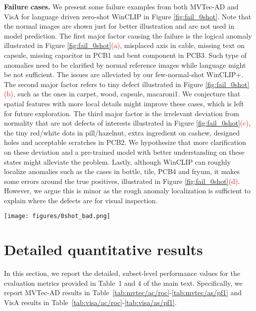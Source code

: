 \clearpage
\noindent\textbf{Failure cases. } 
We present some failure examples from both MVTec-AD and VisA for language driven zero-shot WinCLIP in Figure \ref{fig:fail_0shot}. Note that the normal images are shown just for better illustration and are not used in model prediction. The first major factor causing the failure is the logical anomaly \cite{bergmann2022beyond} illustrated in Figure \ref{fig:fail_0shot}\textcolor{red}{(a)}, \eg misplaced axis in cable, missing text on capsule, missing capacitor in PCB1 and bent component in PCB3. Such type of anomalies need to be clarified by normal reference images while language might be not sufficient. The issues are alleviated by our few-normal-shot WinCLIP+. The second major factor refers to tiny defect illustrated in Figure \ref{fig:fail_0shot}\textcolor{red}{(b)}, such as the ones in carpet, wood, capsule, macaroni1. We conjecture that spatial features with more local details might improve these cases, which is left for future exploration. The third major factor is the irrelevant deviation from normality that are not defects of interests illustrated in Figure \ref{fig:fail_0shot}\textcolor{red}{(c)}, \eg the tiny red/white dots in pill/hazelnut, extra ingredient on cashew, designed holes and acceptable scratches in PCB2. We hypothesize that more clarification on these deviation and a pre-trained model with better understanding on these states might alleviate the problem. Lastly, although WinCLIP can roughly localize anomalies such as the cases in bottle, tile, PCB4 and fryum, it makes some errors around the true positives, illustrated in Figure \ref{fig:fail_0shot}\textcolor{red}{(d)}. However, we argue this is minor as the rough anomaly localization is sufficient to explain where the defects are for visual inspection. 

\begin{figure*}[ht]
  \texttt{[image: figures/0shot\_bad.png]}
  \caption{Curated illustrations of failure cases from zero-shot WinCLIP.}
  \label{fig:fail_0shot}
\end{figure*}

\clearpage
\FloatBarrier
\section{Detailed quantitative results}

In this section, we report the detailed, subset-level performance values for the evaluation metrics provided in Table~1 and 4 of the main text. Specifically, we report MVTec-AD results in Table~\ref{tab:mvtec/ac/roc}-\ref{tab:mvtec/as/pf1} and VisA results in Table~\ref{tab:visa/ac/roc}-\ref{tab:visa/as/pf1}.



